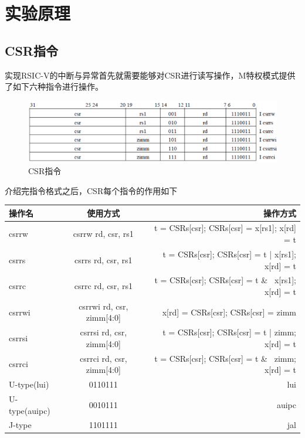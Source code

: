 
\section{实验原理}
\subsection{CSR指令}
实现RSIC-V的中断与异常首先就需要能够对CSR进行读写操作，M特权模式提供了如下六种指令进行操作。\\

\begin{figure}[H] %
    \centering %
    \includegraphics[width=1.0\textwidth]{figs/csr.png} %
    \caption{CSR指令} %
    \label{Fig.1} %
\end{figure}

介绍完指令格式之后，CSR每个指令的作用如下\\

\begin{tabular}{|l|c|r|}
    \hline
    操作名 & 使用方式 & 操作方式\\
    \hline
    csrrw & csrrw rd, csr, rs1 & t = CSRs[csr]; CSRs[csr] = x[rs1]; x[rd] = t \\
    \hline
    csrrs & csrrs rd, csr, rs1 & t = CSRs[csr]; CSRs[csr] = t | x[rs1]; x[rd] = t \\
    \hline
    csrrc & csrrc rd, csr, rs1  & t = CSRs[csr]; CSRs[csr] = t \& ~x[rs1]; x[rd] = t \\
    \hline
    csrrwi & csrrwi rd, csr, zimm[4:0] & x[rd] = CSRs[csr]; CSRs[csr] = zimm \\
    \hline
    csrrsi & csrrsi rd, csr, zimm[4:0] & t = CSRs[csr]; CSRs[csr] = t | zimm; x[rd] = t \\
    \hline 
    csrrci & csrrci rd, csr, zimm[4:0] & t = CSRs[csr]; CSRs[csr] = t \& ~zimm; x[rd] = t \\
    \hline
    U-type(lui) & 0110111 & lui \\
    \hline
    U-type(auipc) & 0010111 & auipc \\
    \hline
    J-type & 1101111 & jal \\
    \hline
\end{tabular} \\

